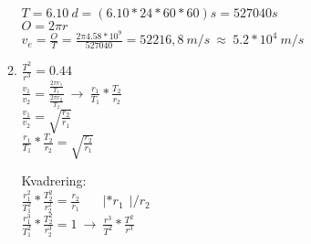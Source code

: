 \documentclass[12pt, letterpaper, twoside]{article}
\begin{document}
\begin{flushleft}
\begin{enumerate}[label=\textbf{Del \Alph*}]
\begin{enumerate}[label=\textbf{\alph*)}]
	$T=6.10\ d=(6.10*24*60*60)s=527040s$\\
	$O=2\pi r$\\
	$v_e=\frac{O}{T}=\frac{2\pi 4.58*10^9}{527040}=52216,8\ m/s\ \approx\ 5.2*10^4\ m/s$

	\hfill
	\hfill

	\item
	$\frac{T^2}{r^3}=0.44$\\
	$\frac{v_1}{v_2}=\frac{\frac{2\pi r_1}{T_1}}{\frac{2\pi r_2}{T_2}}\ \rightarrow\ \frac{r_1}{T_1}*\frac{T_2}{r_2}$\\
	$\frac{v_1}{v_2}=\sqrt{\frac{r_2}{r_1}}$\\
	$\frac{r_1}{T_1}*\frac{T_2}{r_2}=\sqrt{\frac{r_2}{r_1}}$

	\hfill

	Kvadrering:\\

	$\frac{r_1^2}{T_1^2}*\frac{T_2^2}{r_2^2}=\frac{r_2}{r_1}\ \ \ \ \ \ \ \ | *r_1\ \ |/r_2$\\
	$\frac{r_1^3}{T_1^2}*\frac{T_2^2}{r_2^3}=1\ \rightarrow\ \frac{r^3}{T^2}* \frac{T^2}{r^3}$


    \end{enumerate}
\end{enumerate}

\end{flushleft}
\end{document}
